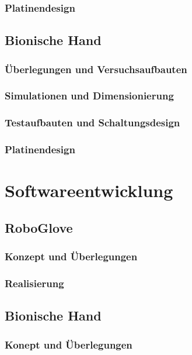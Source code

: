 \documentclass[11pt]{article}
\begin{document}
\subsubsection{Platinendesign}

\subsection{Bionische Hand}
\subsubsection{Überlegungen und Versuchsaufbauten}
\subsubsection{Simulationen und Dimensionierung}
\subsubsection{Testaufbauten und Schaltungsdesign}
\subsubsection{Platinendesign}


\section{Softwareentwicklung}

\subsection{RoboGlove}
\subsubsection{Konzept und Überlegungen}
\subsubsection{Realisierung}

\subsection{Bionische Hand}
\subsubsection{Konept und Überlegungen}
\end{document}
